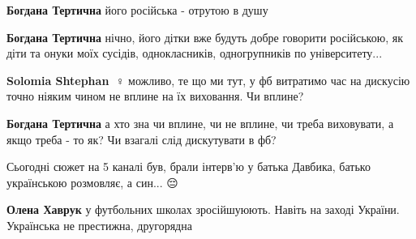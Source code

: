\begin{itemize}
\begin{itemize}
\textbf{Богдана Тертична} його російська - отрутою в душу

 
\textbf{Богдана Тертична} нічно, його дітки вже будуть добре говорити
російською, як діти та онуки моїх сусідів, однокласників, одногрупників по
університету...

 
\textbf{Solomia Shtephan} 🤷♀️ можливо, те що ми тут, у фб витратимо час на дискусію точно ніяким чином не вплине на їх виховання. Чи вплине?

 
\textbf{Богдана Тертична} а хто зна чи вплине, чи не вплине, чи треба виховувати, а якщо треба - то як? Чи взагалі слід дискутувати в фб?
\end{itemize}

 
Сьогодні сюжет на 5 каналі був, брали інтерв'ю у батька Давбика, батько
українською розмовляє, а син... 😔

\begin{itemize}
 
\textbf{Олена Хаврук} у футбольних школах зросійшуюють. Навіть на заході України. Українська не престижна, другорядна

 

\end{itemize}
\end{itemize}
